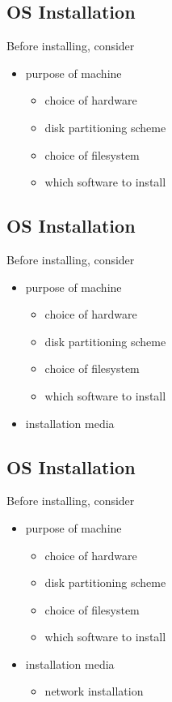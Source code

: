 \documentclass[xga]{xdvislides}
\begin{document}
\subsection{OS Installation}
Before installing, consider
\begin{itemize}
	\item purpose of machine
		\begin{itemize}
			\item choice of hardware
			\item disk partitioning scheme
			\item choice of filesystem
			\item which software to install
		\end{itemize}
\end{itemize}

\subsection{OS Installation}
Before installing, consider
\begin{itemize}
	\item purpose of machine
		\begin{itemize}
			\item choice of hardware
			\item disk partitioning scheme
			\item choice of filesystem
			\item which software to install
		\end{itemize}
	\item installation media
\end{itemize}

\subsection{OS Installation}
Before installing, consider
\begin{itemize}
	\item purpose of machine
		\begin{itemize}
			\item choice of hardware
			\item disk partitioning scheme
			\item choice of filesystem
			\item which software to install
		\end{itemize}
	\item installation media
		\begin{itemize}
			\item network installation
		\end{itemize}
\end{itemize}
\end{document}
